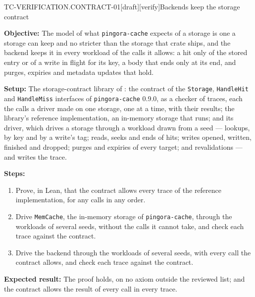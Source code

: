 \begin{requirement}{TC-VERIFICATION.CONTRACT-01}[draft][verify]{Backends keep the storage contract}


  \textbf{Objective:} The model of what \texttt{pingora-cache} expects of a
  storage is one a storage can keep and no stricter than the storage that
  crate ships, and the backend keeps it in every workload of the calls it
  allows: a hit only of the stored entry or of a write in flight for its
  key, a body that ends only at its end, and purges, expiries and metadata
  updates that hold.

  \textbf{Setup:} The storage-contract library of
  : the contract of the
  \texttt{Storage}, \texttt{HandleHit} and \texttt{HandleMiss} interfaces of
  \texttt{pingora-cache} 0.9.0, as a checker of traces, each the calls a
  driver made on one storage, one at a time, with their results; the
  library's reference implementation, an in-memory storage that runs; and
  its driver, which drives a storage through a workload drawn from a seed
  --- lookups, by key and by a write's tag; reads, seeks and ends of hits;
  writes opened, written, finished and dropped; purges and expiries of
  every target; and revalidations --- and writes the trace.

  \textbf{Steps:}
  \begin{enumerate}
    \item Prove, in Lean, that the contract allows every trace of the
      reference implementation, for any calls in any order.
    \item Drive \texttt{MemCache}, the in-memory storage of
      \texttt{pingora-cache}, through the workloads of several seeds,
      without the calls it cannot take, and check each trace against the
      contract.
    \item Drive the backend through the workloads of several seeds, with
      every call the contract allows, and check each trace against the
      contract.
  \end{enumerate}

  \textbf{Expected result:} The proof holds, on no axiom outside the
  reviewed list; and the contract allows the result of every call in every
  trace.



\end{requirement}


